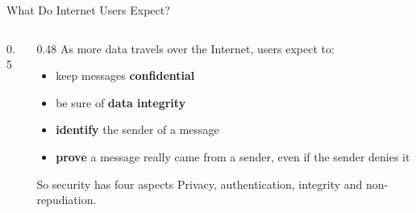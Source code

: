 \documentclass[aspectratio=169,11pt,xcolor={table}]{beamer}
\begin{document}
\begin{frame}{What Do Internet Users Expect?}
  \begin{columns}[c]
    \begin{column}{0.5\textwidth}
      \centering
    \end{column}
    \begin{column}{0.48\textwidth}
      {\small As more data travels over the Internet, users expect to:}
      \begin{itemize}\small\setlength{\itemsep}{3pt}
        \item keep messages \textbf{confidential}
        \item be sure of \textbf{data integrity}
        \item \textbf{identify} the sender of a message
        \item \textbf{prove} a message really came from a sender, even if the sender denies it
      \end{itemize}
      \begin{block}{So security has four aspects}
        \small Privacy, authentication, integrity and non-repudiation.
      \end{block}
    \end{column}
  \end{columns}
\end{frame}
\end{document}
